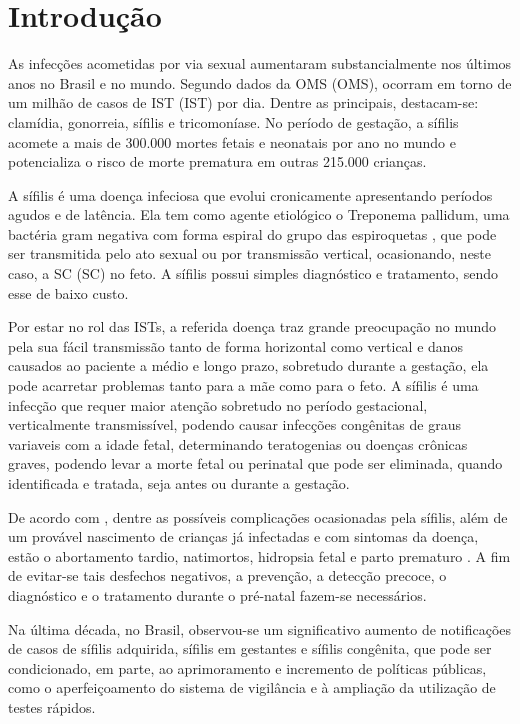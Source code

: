 \chapter{Introdução}
\label{cap:introducao}

As infecções acometidas por via sexual aumentaram substancialmente nos últimos anos no Brasil e no mundo. Segundo dados da \acrlong{OMS} (\acrshort{OMS}), ocorram em torno de um milhão de casos de \acrlong{IST} (\acrshort{IST}) por dia. Dentre as principais, destacam-se: clamídia, gonorreia, sífilis e tricomoníase. No período de gestação, a sífilis acomete a mais de 300.000 mortes fetais e neonatais por ano no mundo e potencializa o risco de morte prematura em outras 215.000 crianças. \cite{boletim2018}

A sífilis é uma doença infeciosa que evolui cronicamente apresentando períodos agudos e de latência. Ela tem como agente etiológico o Treponema pallidum, uma bactéria gram negativa com forma espiral do grupo das espiroquetas \cite{mendes2005microbiologia}, que pode ser transmitida pelo ato sexual ou por transmissão vertical, ocasionando, neste caso, a \acrlong{SC} (\acrshort{SC}) no feto. A sífilis possui simples diagnóstico e tratamento, sendo esse de baixo custo. \cite{brasilprenatal}

Por estar no rol das \acrshort{IST}s, a referida doença traz grande preocupação no mundo pela sua fácil transmissão tanto de forma horizontal como vertical e danos causados ao paciente a médio e longo prazo, sobretudo durante a gestação, ela pode acarretar problemas tanto para a mãe como para o feto. A sífilis é uma infecção que requer maior atenção sobretudo no período gestacional, verticalmente transmissível, podendo causar infecções congênitas de graus variaveis com a idade fetal, determinando teratogenias ou doenças crônicas graves, podendo levar a morte fetal ou perinatal que pode ser eliminada, quando identificada e tratada, seja antes ou durante a gestação. \cite{avelleira2006}

De acordo com \cite{brasilprenatal}, dentre as possíveis complicações ocasionadas pela sífilis, além de um provável nascimento de crianças já infectadas e com sintomas da doença, estão o abortamento tardio, natimortos, hidropsia fetal e parto prematuro \cite{brasilprenatal}. A fim de evitar-se tais desfechos negativos, a prevenção, a detecção precoce, o diagnóstico e o tratamento durante o pré-natal fazem-se necessários.

Na última década, no Brasil, observou-se um significativo aumento de notificações de casos de sífilis adquirida, sífilis em gestantes e sífilis congênita, que pode ser condicionado, em parte, ao aprimoramento e incremento de políticas públicas, como o aperfeiçoamento do sistema de vigilância e à ampliação da utilização de testes rápidos. \cite{boletim2018}

